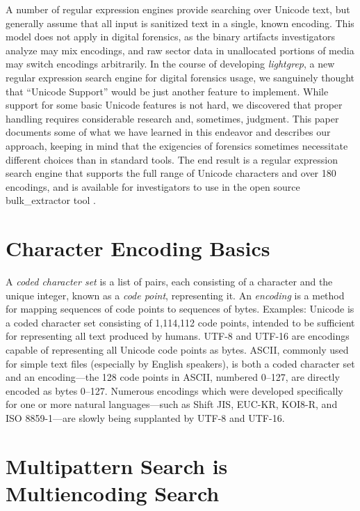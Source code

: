 \documentclass[5p,final,number,sort&compress]{elsarticle}
\begin{document}
A number of regular expression engines provide searching over Unicode text, but generally assume that all input is sanitized text in a single, known encoding. This model does not apply in digital forensics, as the binary artifacts investigators analyze may mix encodings, and raw sector data in unallocated portions of media may switch encodings arbitrarily. In the course of developing \emph{lightgrep}, a new regular expression search engine for digital forensics usage, we sanguinely thought that ``Unicode Support'' would be just another feature to implement. While support for some basic Unicode features is not hard, we discovered that proper handling requires considerable research and, sometimes, judgment. This paper documents some of what we have learned in this endeavor and describes our approach, keeping in mind that the exigencies of forensics sometimes necessitate different choices than in standard tools. The end result is a regular expression search engine that supports the full range of Unicode characters and over 180 encodings, and is available for investigators to use in the open source bulk\_extractor tool \citep{BulkExtractor}.

\section{Character Encoding Basics}

A \emph{coded character set} is a list of pairs, each consisting of a character and the unique integer, known as a \emph{code point}, representing it.  An \emph{encoding} is a method for mapping sequences of code points to sequences of bytes. Examples: Unicode is a coded character set consisting of 1,114,112 code points, intended to be sufficient for representing all text produced by humans. UTF-8 and UTF-16 are encodings capable of representing all Unicode code points as bytes. ASCII, commonly used for simple text files (especially by English speakers), is both a coded character set and an encoding---the 128 code points in ASCII, numbered 0--127, are directly encoded as bytes 0--127. Numerous encodings which were developed specifically for one or more natural languages---such as Shift JIS, EUC-KR, KOI8-R, and ISO 8859-1---are slowly being supplanted by UTF-8 and UTF-16.

\section{Multipattern Search is Multiencoding Search}
\label{sec:multi}
\end{document}
